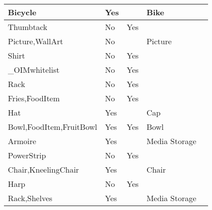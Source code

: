 \documentclass{article}
\begin{document}
\begin{longtable}{|l|l|l|l|l|}
Bicycle                                  & Yes              &                                & Bike           &                             \\ \hline
Thumbtack                                & No               & Yes                            &                &                             \\ \hline
Picture,WallArt                          & No               &                                & Picture        &                             \\ \hline
Shirt                                    & No               & Yes                            &                &                             \\ \hline
\_OIMwhitelist                           & No               & Yes                            &                &                             \\ \hline
Rack                                     & No               & Yes                            &                &                             \\ \hline
Fries,FoodItem                           & No               & Yes                            &                &                             \\ \hline
Hat                                      & Yes              &                                & Cap            &                             \\ \hline
Bowl,FoodItem,FruitBowl                  & Yes              & Yes                            & Bowl           &                             \\ \hline
Armoire                                  & Yes              &                                & Media Storage  &                             \\ \hline
PowerStrip                               & No               & Yes                            &                &                             \\ \hline
Chair,KneelingChair                      & Yes              &                                & Chair          &                             \\ \hline
Harp                                     & No               & Yes                            &                &                             \\ \hline
Rack,Shelves                             & Yes              &                                & Media Storage  &                             \\ \hline

\end{longtable}
\end{document}
